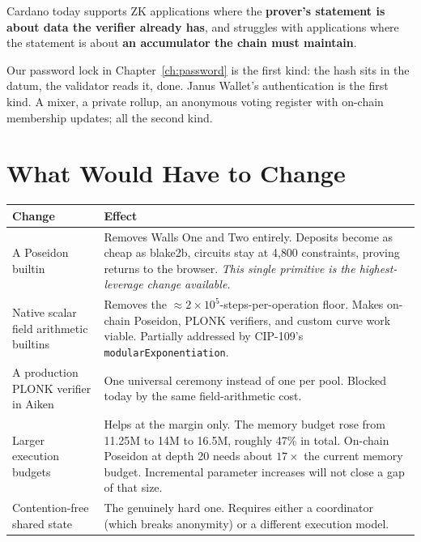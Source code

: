 \begin{outline}
Cardano today supports ZK applications where the \textbf{prover's statement is
about data the verifier already has}, and struggles with applications where the
statement is about \textbf{an accumulator the chain must maintain}.
\end{outline}

Our password lock in Chapter~\ref{ch:password} is the first kind: the hash sits
in the datum, the validator reads it, done. Janus Wallet's authentication is the
first kind. A mixer, a private rollup, an anonymous voting register with
on-chain membership updates; all the second kind.

\section{What Would Have to Change} \label{sec:ch8-changes}

\begin{center}
\begin{tabular}{p{4.0cm}p{8.0cm}}
  \hline
  \textbf{Change} & \textbf{Effect} \\
  \hline
  A Poseidon builtin
    & Removes Walls One and Two entirely. Deposits become as cheap as
      blake2b, circuits stay at 4{,}800 constraints, proving returns to the
      browser. \emph{This single primitive is the highest-leverage change
      available.} \\
  \addlinespace
  Native scalar field arithmetic builtins
    & Removes the $\approx 2\times10^5$-steps-per-operation floor. Makes
      on-chain Poseidon, PLONK verifiers, and custom curve work viable.
      Partially addressed by CIP-109's \texttt{modularExponentiation}. \\
  \addlinespace
  A production PLONK verifier in Aiken
    & One universal ceremony instead of one per pool. Blocked today by the
      same field-arithmetic cost. \\
  \addlinespace
  Larger execution budgets
    & Helps at the margin only. The memory budget rose from 11.25M to 14M to
      16.5M, roughly 47\% in total. On-chain Poseidon at depth 20 needs
      about $17\times$ the current memory budget. Incremental parameter
      increases will not close a gap of that size. \\
  \addlinespace
  Contention-free shared state
    & The genuinely hard one. Requires either a coordinator (which breaks
      anonymity) or a different execution model. \\
  \hline
\end{tabular}
\end{center}

